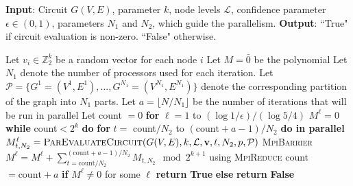 \begin{algorithm}{}
\small
\caption{\parmaxwt{}$(G(V,E), k, \mathcal{L}, \epsilon, N_1, N_2)$.}
\label{alg:parallel-kMLD} 
\begin{algorithmic}[1]
\STATE \textbf{Input}: Circuit $G(V, E)$, parameter $k$, node levels $\mathcal{L}$,
confidence parameter $\epsilon\in (0, 1)$, parameters $N_1$ and $N_2$, which guide the parallelism.
\STATE\textbf{Output}: ``True" if circuit evaluation is non-zero. ``False" otherwise.

\STATE Let $v_i \in \mathbb{Z}_2^k$ be a random vector for each node $i$
\STATE Let $M = \bar 0$ be the polynomial
\STATE Let $N_1$ denote the number of processors used for each iteration.
Let $\mathcal{P}=\{G^1= (V^1, E^1), \ldots, G^{N_1}=(V^{N_1}, E^{N_1})\}$ denote the corresponding
partition of the graph into $N_1$ parts.
\STATE Let $a = \lfloor N / N_1 \rfloor$ be the number of iterations that will be run in parallel
\STATE Let count $=0$
\STATE \textbf{for} $\ell=1$ to $(\log{1/\epsilon})/(\log{5/4})$ 
\STATE \quad $M^{\ell}=0$
\STATE \quad \textbf{while} count$ < 2^k$ \textbf{do}
\STATE \quad \quad \textbf{for} $t =$ count$/N_2$ to $(\text{count} + a - 1)/N_2$ \textbf{do in parallel}
\STATE \quad \qquad  $M^{\ell}_{t,N_2} = \textsc{ParEvaluateCircuit}(G(V, E), k, \mathcal{L}, \mathbf{v}, t, N_2, p, \mathcal{P})$
\STATE \quad \quad \textsc{MpiBarrier}
\STATE \quad \quad $M^{\ell} = M^{\ell} + \sum_{t=\text{count}/N_2}^{(\text{count} + a - 1)/N_2} M_{t,N_2} \mod 2^{k+1}$ using \textsc{MpiReduce}
\STATE \quad \quad count $= \text{count} + a$
\STATE \textbf{if} $M^{\ell}\neq 0$ for some $\ell$
\STATE \quad \textbf{return} \textbf{True}
\STATE \textbf{else} 
\STATE \quad \textbf{return} \textbf{False}
\end{algorithmic}
\end{algorithm}

